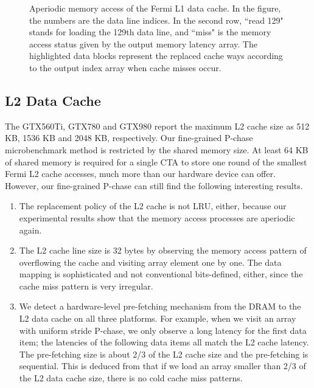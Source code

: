 \documentclass[10pt,journal,compsoc]{IEEEtran}
\theoremstyle{definition}
\begin{document}
\begin{figure}
\vspace{-0.5em}
\caption{Aperiodic memory access of the Fermi L1 data cache. In the figure, the numbers are the data line indices. In the second row, ``read 129" stands for loading the 129th data line, and ``miss" is the memory access status given by the output memory latency array. The highlighted data blocks represent the replaced cache ways according to the output index array when cache misses occur. }
\label{fig:ProcessL1}
\end{figure}

\subsection{L2 Data Cache}



The GTX560Ti, GTX780 and GTX980 report the maximum L2 cache size as 512 KB, 1536 KB and 2048 KB, respectively. Our fine-grained P-chase microbenchmark method is restricted by the shared memory size. At least 64 KB of shared memory is required for a single CTA to store one round of the smallest Fermi L2 cache accesses, much more than our hardware device can offer. However, our fine-grained P-chase can still find the following interesting results.

\begin{enumerate}
  \item The replacement policy of the L2 cache is not LRU, either, because our experimental results show that the memory access processes are aperiodic again.
  \item The L2 cache line size is 32 bytes by observing the memory access pattern of overflowing the cache and visiting array element one by one. The data mapping is sophisticated and not conventional bits-defined, either, since the cache miss pattern is very irregular.
  \item We detect a hardware-level pre-fetching mechanism from the DRAM to the L2 data cache on all three platforms. For example, when we visit an array with uniform stride P-chase, we only observe a long latency for the first data item; the latencies of the following data items all match the L2 cache latency. The pre-fetching size is about 2/3 of the L2 cache size and the pre-fetching is sequential. This is deduced from that if we load an array smaller than 2/3 of the L2 data cache size, there is no cold cache miss patterns.
\end{enumerate}
\end{document}
